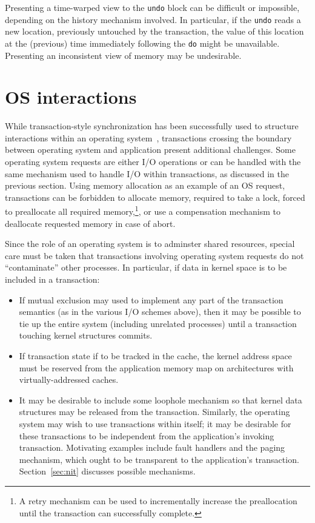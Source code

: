 Presenting a time-warped view to the \texttt{undo} block can be
difficult or impossible, depending on the history mechanism involved.
In particular, if the \texttt{undo} reads a new location, previously
untouched by the transaction, the value of this location at the
(previous) time immediately following the \texttt{do} might be
unavailable.  Presenting an inconsistent view of memory may be
undesirable.

\section{OS interactions}
While transaction-style synchronization has been successfully used to
structure interactions within an operating system~\cite{MassalinPu91},
transactions crossing the boundary between operating system and
application present additional challenges.  Some operating system
requests are either I/O operations or can be handled with the same
mechanism used to handle I/O within transactions, as discussed in the
previous section.  Using memory allocation as an example of an OS
request, transactions can be forbidden to allocate memory, required to
take a lock, forced to preallocate all required memory,\footnote{A
retry mechanism can be used to incrementally increase the
preallocation until the transaction can successfully complete.}, or
use a compensation mechanism to deallocate requested memory in case of
abort.

Since the role of an operating system is to adminster shared
resources, special care must be taken that transactions involving
operating system requests do not ``contaminate'' other processes.
In particular, if data in kernel space is to be included in a
transaction:
\begin{itemize}
\item If mutual exclusion may used to implement any part of the
transaction semantics (as in the various I/O schemes above), then it
may be possible to tie up the entire system (including unrelated
processes) until a transaction touching kernel structures commits.
\item If transaction state if to be tracked in the cache, the
kernel address space must be reserved from the application memory map
 on architectures with virtually-addressed caches.
\item It may be desirable to include some loophole mechanism
 so that kernel data structures may be released from the transaction.
 Similarly, the operating system may wish to use transactions within
 itself; it may be desirable for these transactions to be independent
 from the application's invoking transaction.  Motivating examples
 include fault handlers and the paging mechanism, which ought to be
 transparent to the application's transaction.  Section~\ref{sec:nit}
 discusses possible mechanisms.
\end{itemize}

